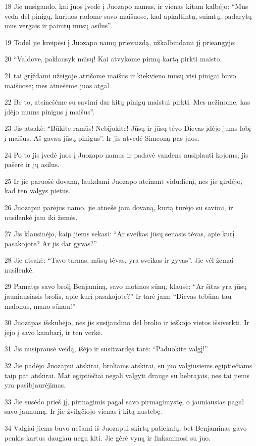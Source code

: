 \par 18 Jie nusigando, kai juos įvedė į Juozapo namus, ir vienas kitam kalbėjo: “Mus veda dėl pinigų, kuriuos radome savo maišuose, kad apkaltintų, suimtų, padarytų mus vergais ir paimtų mūsų asilus”. 
\par 19 Todėl jie kreipėsi į Juozapo namų prievaizdą, užkalbindami jį prieangyje: 
\par 20 “Valdove, paklausyk mūsų! Kai atvykome pirmą kartą pirkti maisto, 
\par 21 tai grįždami užeigoje atrišome maišus ir kiekvieno mūsų visi pinigai buvo maišuose; mes atnešėme juos atgal. 
\par 22 Be to, atsinešėme su savimi dar kitų pinigų maistui pirkti. Mes nežinome, kas įdėjo mums pinigus į maišus”. 
\par 23 Jis atsakė: “Būkite ramūs! Nebijokite! Jūsų ir jūsų tėvo Dievas įdėjo jums lobį į maišus. Aš gavau jūsų pinigus”. Ir jis atvedė Simeoną pas juos. 
\par 24 Po to jis įvedė juos į Juozapo namus ir padavė vandens nusiplauti kojoms; jis pašėrė ir jų asilus. 
\par 25 Ir jie paruošė dovaną, laukdami Juozapo ateinant vidudienį, nes jie girdėjo, kad ten valgys pietus. 
\par 26 Juozapui parėjus namo, jie atnešė jam dovaną, kurią turėjo su savimi, ir nusilenkė jam iki žemės. 
\par 27 Jis klausinėjo, kaip jiems sekasi: “Ar sveikas jūsų senasis tėvas, apie kurį pasakojote? Ar jis dar gyvas?” 
\par 28 Jie atsakė: “Tavo tarnas, mūsų tėvas, yra sveikas ir gyvas”. Jie vėl žemai nusilenkė. 
\par 29 Pamatęs savo brolį Benjaminą, savo motinos sūnų, klausė: “Ar šitas yra jūsų jauniausiasis brolis, apie kurį pasakojote?” Ir tarė jam: “Dievas tebūna tau malonus, mano sūnau!” 
\par 30 Juozapas išskubėjo, nes jis susijaudino dėl brolio ir ieškojo vietos išsiverkti. Ir įėjo į savo kambarį, ir ten verkė. 
\par 31 Jis nusiprausė veidą, išėjo ir susitvardęs tarė: “Paduokite valgį!” 
\par 32 Jie padėjo Juozapui atskirai, broliams atskirai, su juo valgiusiems egiptiečiams taip pat atskirai. Mat egiptiečiai negali valgyti drauge su hebrajais, nes tai jiems yra pasibjaurėjimas. 
\par 33 Jie susėdo prieš jį, pirmagimis pagal savo pirmagimystę, o jauniausias pagal savo jaunumą. Ir jie žvilgčiojo vienas į kitą nustebę. 
\par 34 Valgiai jiems buvo nešami iš Juozapui skirtų patiekalų, bet Benjaminas gavo penkis kartus daugiau negu kiti. Jie gėrė vyną ir linksminosi su juo.



